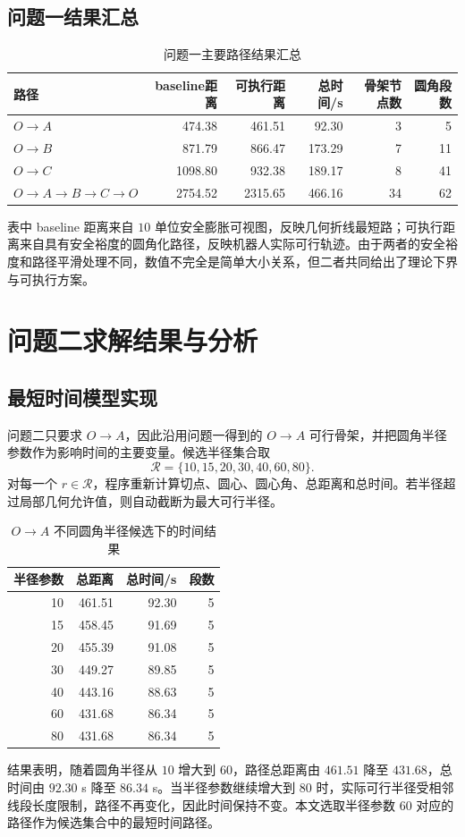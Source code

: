 \documentclass[UTF8,a4paper,12pt]{ctexart}
\begin{document}
\subsection{问题一结果汇总}
\begin{table}[H]
\centering
\caption{问题一主要路径结果汇总}
\begin{tabular}{lrrrrr}
\toprule
路径 & baseline距离 & 可执行距离 & 总时间/s & 骨架节点数 & 圆角段数\\
\midrule
$O\to A$ & 474.38 & 461.51 & 92.30 & 3 & 5\\
$O\to B$ & 871.79 & 866.47 & 173.29 & 7 & 11\\
$O\to C$ & 1098.80 & 932.38 & 189.17 & 8 & 41\\
$O\to A\to B\to C\to O$ & 2754.52 & 2315.65 & 466.16 & 34 & 62\\
\bottomrule
\end{tabular}
\end{table}
表中 baseline 距离来自 $10$ 单位安全膨胀可视图，反映几何折线最短路；可执行距离来自具有安全裕度的圆角化路径，反映机器人实际可行轨迹。由于两者的安全裕度和路径平滑处理不同，数值不完全是简单大小关系，但二者共同给出了理论下界与可执行方案。

\section{问题二求解结果与分析}
\subsection{最短时间模型实现}
问题二只要求 $O\to A$，因此沿用问题一得到的 $O\to A$ 可行骨架，并把圆角半径参数作为影响时间的主要变量。候选半径集合取
\begin{equation}
\mathcal{R}=\{10,15,20,30,40,60,80\}.
\end{equation}
对每一个 $r\in\mathcal{R}$，程序重新计算切点、圆心、圆心角、总距离和总时间。若半径超过局部几何允许值，则自动截断为最大可行半径。

\begin{table}[H]
\centering
\caption{$O\to A$ 不同圆角半径候选下的时间结果}
\begin{tabular}{rrrr}
\toprule
半径参数 & 总距离 & 总时间/s & 段数\\
\midrule
10 & 461.51 & 92.30 & 5\\
15 & 458.45 & 91.69 & 5\\
20 & 455.39 & 91.08 & 5\\
30 & 449.27 & 89.85 & 5\\
40 & 443.16 & 88.63 & 5\\
60 & 431.68 & 86.34 & 5\\
80 & 431.68 & 86.34 & 5\\
\bottomrule
\end{tabular}
\end{table}
结果表明，随着圆角半径从 $10$ 增大到 $60$，路径总距离由 $461.51$ 降至 $431.68$，总时间由 $92.30$ s 降至 $86.34$ s。当半径参数继续增大到 $80$ 时，实际可行半径受相邻线段长度限制，路径不再变化，因此时间保持不变。本文选取半径参数 $60$ 对应的路径作为候选集合中的最短时间路径。
\end{document}

